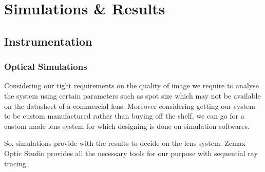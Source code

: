 \documentclass[../../main.tex]{subfiles}
\begin{document}
\chapter{Simulations \& Results}
\thispagestyle{fancy}



\blindtext

\section{Instrumentation}
\subsection{Optical Simulations}
Considering our tight requirements on the quality of image we require to analyse the system using certain parameters such as spot size which may not be available on the datasheet of a commercial lens.
Moreover considering getting our system to be custom manufactured rather than buying off the shelf, we can go for a custom made lens system for which designing is done on simulation softwares.

So, simulations provide with the results to decide on the lens system.
Zemax Optic Studio provides all the necessary tools for our purpose with sequential ray tracing.
\end{document}
